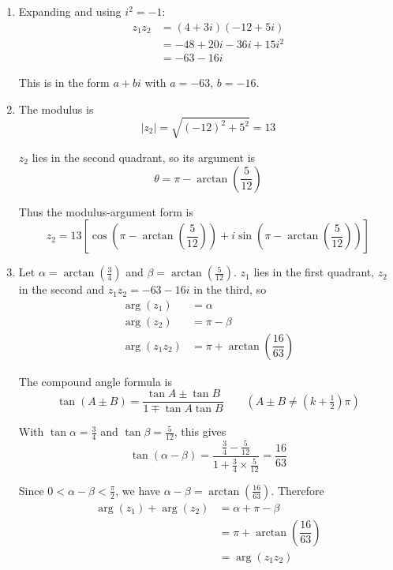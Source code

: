 \documentclass[leqno]{article}
\begin{document}
\begin{enumerate}[
  label=\textbf{\arabic*.},
  leftmargin=*,
  topsep=0pt,
  partopsep=0pt,
  parsep=0pt
]
\begin{djsSolution}
\begin{enumerate}[label=\textbf{(\alph*)}, start=1]
\item Expanding and using \(i^2=-1\):
\begin{align*}
z_1z_2&=(4+3i)(-12+5i)\\
&=-48+20i-36i+15i^2\\
&=-63-16i
\end{align*}

This is in the form \(a+bi\) with \(a=-63\), \(b=-16\).

\item The modulus is
\[
|z_2|=\sqrt{(-12)^2+5^2}=13
\]

\(z_2\) lies in the second quadrant, so its argument is
\[
\theta=\pi-\arctan\left(\dfrac{5}{12}\right)
\]

Thus the modulus-argument form is
\[
z_2=13\left[\cos\left(\pi-\arctan\left(\dfrac{5}{12}\right)\right)+i\sin\left(\pi-\arctan\left(\dfrac{5}{12}\right)\right)\right]
\]

\item Let \(\alpha=\arctan(\frac34)\) and \(\beta=\arctan(\frac5{12})\). \(z_1\) lies in the first quadrant, \(z_2\) in the second and \(z_1z_2=-63-16i\) in the third, so
\begin{align*}
\arg(z_1)&=\alpha\\
\arg(z_2)&=\pi-\beta\\
\arg(z_1z_2)&=\pi+\arctan\left(\dfrac{16}{63}\right)
\end{align*}

The compound angle formula is
\[
\tan(A\pm B)=\dfrac{\tan A\pm\tan B}{1\mp\tan A\tan B}\qquad\left(A\pm B\neq\left(k+\tfrac12\right)\pi\right)
\]

With \(\tan\alpha=\frac34\) and \(\tan\beta=\frac5{12}\), this gives
\[
\tan(\alpha-\beta)
=\dfrac{\frac34-\frac5{12}}{1+\frac34\times\frac5{12}}
=\dfrac{16}{63}
\]

Since \(0<\alpha-\beta<\frac{\pi}{2}\), we have \(\alpha-\beta=\arctan(\frac{16}{63})\). Therefore
\begin{align*}
\arg(z_1)+\arg(z_2)
&=\alpha+\pi-\beta\\
&=\pi+\arctan\left(\dfrac{16}{63}\right)\\
&=\arg(z_1z_2)
\end{align*}

\end{enumerate}
\end{djsSolution}


\end{enumerate}
\end{document}
